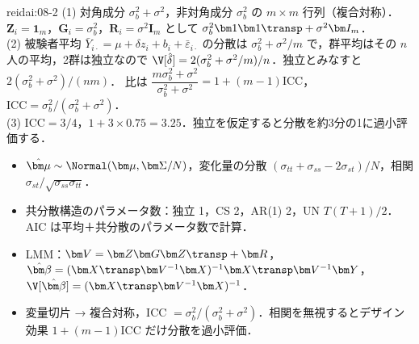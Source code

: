 \begin{kaitou}{reidai:08-2}
(1) 対角成分 $\sigma_b^2+\sigma^2$，非対角成分 $\sigma_b^2$ の $m\times m$ 行列（複合対称）．$\bm Z_i=\bm1_m$，$\bm G_i=\sigma_b^2$，$\bm R_i=\sigma^2\bm I_m$ として $\sigma_b^2\bm1\bm1\transp+\sigma^2\bm I_m$．\\
(2) 被験者平均 $\bar Y_{i\cdot}=\mu+\delta z_i+b_i+\bar\varepsilon_{i\cdot}$ の分散は $\sigma_b^2+\sigma^2/m$ で，群平均はその $n$ 人の平均，2群は独立なので
$\V[\hat\delta]=2(\sigma_b^2+\sigma^2/m)/n$．独立とみなすと $2(\sigma_b^2+\sigma^2)/(nm)$．
比は $\dfrac{m\sigma_b^2+\sigma^2}{\sigma_b^2+\sigma^2}=1+(m-1)\mathrm{ICC}$，$\mathrm{ICC}=\sigma_b^2/(\sigma_b^2+\sigma^2)$．\\
(3) $\mathrm{ICC}=3/4$，$1+3\times0.75=3.25$．独立を仮定すると分散を約3分の1に過小評価する．
\end{kaitou}

\begin{summarybox}
\begin{itemize}
\item $\hat{\bm\mu}\sim\Normal(\bm\mu,\bm\Sigma/N)$，変化量の分散 $(\sigma_{tt}+\sigma_{ss}-2\sigma_{st})/N$，相関 $\sigma_{st}/\sqrt{\sigma_{ss}\sigma_{tt}}$．
\item 共分散構造のパラメータ数：独立 1，CS 2，AR(1) 2，UN $T(T+1)/2$．AIC は平均＋共分散のパラメータ数で計算．
\item LMM：$\bm V=\bm Z\bm G\bm Z\transp+\bm R$，$\hat{\bm\beta}=(\bm X\transp\bm V^{-1}\bm X)^{-1}\bm X\transp\bm V^{-1}\bm Y$，$\V[\hat{\bm\beta}]=(\bm X\transp\bm V^{-1}\bm X)^{-1}$．
\item 変量切片 → 複合対称，ICC $=\sigma_b^2/(\sigma_b^2+\sigma^2)$．相関を無視するとデザイン効果 $1+(m-1)\mathrm{ICC}$ だけ分散を過小評価．
\end{itemize}
\end{summarybox}
